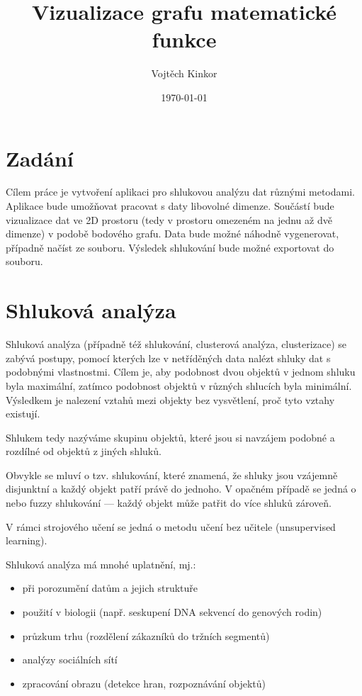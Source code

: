 \documentclass[pdftex,a4paper]{article}
\title{Vizualizace grafu matematické funkce}
\author{Vojtěch Kinkor}
\date{\today}
\begin{document}


\newpage
\tableofcontents
\newpage




\section{Zadání}

Cílem práce je vytvoření aplikaci pro shlukovou analýzu dat různými metodami. Aplikace bude umožňovat pracovat s daty libovolné dimenze. Součástí bude vizualizace dat ve 2D prostoru (tedy v prostoru omezeném na jednu až dvě dimenze) v podobě bodového grafu. Data bude možné náhodně vygenerovat, případně načíst ze souboru. Výsledek shlukování bude možné exportovat do souboru.




\section{Shluková analýza}

Shluková analýza (případně též shlukování, clusterová analýza, clusterizace) se zabývá postupy, pomocí kterých lze v netříděných data nalézt shluky dat s podobnými vlastnostmi. Cílem je, aby podobnost dvou objektů v jednom shluku byla maximální, zatímco podobnost objektů v různých shlucích byla minimální. Výsledkem je nalezení vztahů mezi objekty bez vysvětlení, proč tyto vztahy existují.

Shlukem tedy nazýváme skupinu objektů, které jsou si navzájem podobné a rozdílné od objektů z jiných shluků.

Obvykle se mluví o tzv.  shlukování, které znamená, že shluky jsou vzájemně disjunktní a každý objekt patří právě do jednoho. V opačném případě se jedná o  nebo fuzzy shlukování — každý objekt může patřit do více shluků zároveň.

V rámci strojového učení se jedná o metodu učení bez učitele (unsupervised learning).

Shluková analýza má mnohé uplatnění, mj.:
\begin{itemize}
	\item při porozumění datům a jejich struktuře
	\item použití v biologii (např. seskupení DNA sekvencí do genových rodin)
	\item průzkum trhu (rozdělení zákazníků do tržních segmentů)
	\item analýzy sociálních sítí
	\item zpracování obrazu (detekce hran, rozpoznávání objektů)
\end{itemize}
\end{document}
